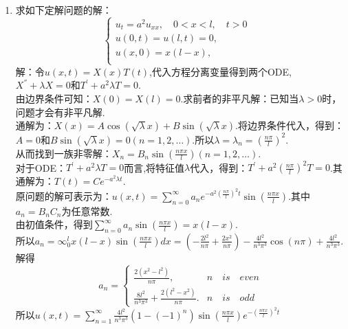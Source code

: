 \documentclass[11pt]{article}
\begin{document}
    \begin{enumerate}
        \item 求如下定解问题的解：
    \begin{equation*}
            \left\{
             \begin{array}{lr}
             u_{t}=a^2u_{xx},\quad 0<x<l,\quad t>0 &  \\
             u(0,t)=u(l,t)=0, & \\
             u(x,0)=x(l-x), &    \\
             \end{array}
            \right.
            \end{equation*}
        解：令$u(x,t)=X(x)T(t)$,代入方程分离变量得到两个ODE,$X^{''}+\lambda X=0$和$T^{'}+a^2\lambda T=0$.\\由边界条件可知：$X(0)=X(l)=0$.求前者的非平凡解：已知当$\lambda>0$时，问题才会有非平凡解.\\通解为：$X(x)=A\cos(\sqrt {\lambda}x)+B\sin(\sqrt {\lambda}x)$.将边界条件代入，得到：\\$A=0$和$B\sin(\sqrt {\lambda}x)=0(n=1,2,\dots)$.所以$\lambda = \lambda_n=(\frac{n\pi}{l})^2$.\\从而找到一族非零解：$X_n=B_n\sin(\frac{n\pi x}{l})(n=1,2,\dots)$.
            \\对于ODE：$T^{'}+a^2\lambda T=0$而言,将特征值$\lambda$代入，得到：$T^{'}+a^2(\frac{n\pi}{l})^2 T=0$.其通解为：$T(t)=Ce^{-a^2\lambda t}$.\\原问题的解可表示为：$u(x,t)=\sum_{n=0}^{\infty}a_ne^{-a^2(\frac{n\pi}{l})^2 t}\sin(\frac{n\pi x}{l})$.其中$a_n=B_{n}C_n$为任意常数.\\由初值条件，得到$\sum_{n=0}^{\infty}a_n\sin(\frac{n\pi x}{l})=x(l-x).$\\ 所以$a_n=\infty^l_0 x(l-x)\sin(\frac{n\pi x}{l})dx=(-\frac{2l^2}{n\pi}+\frac{2x^2}{n\pi})-\frac{4l^2}{n^3\pi^3}\cos(n\pi)+\frac{4l^2}{n^3\pi^3}$.
            解得\begin{equation*}
            a_n=\begin{cases}
                    \frac{2(x^2-l^2)}{n\pi},& n\quad is\quad even\\
                    \frac{8l^2}{n^3\pi^3}+\frac{2(l^2-x^2)}{n\pi}.& n\quad is \quad odd
            \end{cases}
            \end{equation*}
        所以$u(x,t)=\sum_{n=1}^{\infty}\frac{4l^2}{n^3\pi^3}(1-(-1)^{n})\sin(\frac{n\pi x}{l})e^{-(\frac{n\pi x}{l})^2t}$



\end{enumerate}
\end{document}
